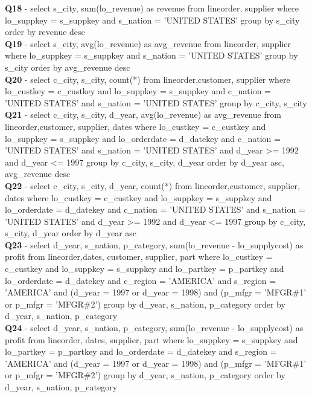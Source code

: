 \textbf{Q18} - select s\_city, sum(lo\_revenue) as revenue from lineorder, supplier where lo\_suppkey = s\_suppkey and s\_nation = 'UNITED STATES' group by s\_city order by revenue desc \\

\textbf{Q19} - select s\_city, avg(lo\_revenue) as avg\_revenue from lineorder, supplier where lo\_suppkey = s\_suppkey and s\_nation = 'UNITED STATES' group by s\_city order by avg\_revenue desc \\

\textbf{Q20} - select c\_city, s\_city, count(*) from lineorder,customer,  supplier where lo\_custkey = c\_custkey and lo\_suppkey = s\_suppkey and c\_nation = 'UNITED STATES' and s\_nation = 'UNITED STATES' group by c\_city, s\_city \\

\textbf{Q21} - select c\_city, s\_city, d\_year, avg(lo\_revenue) as avg\_revenue from  lineorder,customer, supplier, dates where lo\_custkey = c\_custkey and lo\_suppkey = s\_suppkey and lo\_orderdate = d\_datekey and c\_nation = 'UNITED STATES' and s\_nation = 'UNITED STATES' and d\_year >= 1992 and d\_year <= 1997 group by c\_city, s\_city, d\_year order by d\_year asc, avg\_revenue desc \\

\textbf{Q22} - select c\_city, s\_city, d\_year, count(*) from lineorder,customer,  supplier, dates where lo\_custkey = c\_custkey and lo\_suppkey = s\_suppkey and lo\_orderdate = d\_datekey and c\_nation = 'UNITED STATES' and s\_nation = 'UNITED STATES' and d\_year >= 1992 and d\_year <= 1997 group by c\_city, s\_city, d\_year order by d\_year asc \\

\textbf{Q23 }- select d\_year, s\_nation, p\_category, sum(lo\_revenue - lo\_supplycost) as profit from lineorder,dates, customer, supplier, part  where lo\_custkey = c\_custkey and lo\_suppkey = s\_suppkey and lo\_partkey = p\_partkey and lo\_orderdate = d\_datekey and c\_region = 'AMERICA' and s\_region = 'AMERICA' and (d\_year = 1997 or d\_year = 1998) and (p\_mfgr = 'MFGR\#1' or p\_mfgr = 'MFGR\#2') group by d\_year, s\_nation, p\_category order by d\_year, s\_nation, p\_category \\

\textbf{Q24} - select d\_year, s\_nation, p\_category, sum(lo\_revenue - lo\_supplycost) as profit from lineorder, dates, supplier, part  where lo\_suppkey = s\_suppkey and lo\_partkey = p\_partkey and lo\_orderdate = d\_datekey and s\_region = 'AMERICA' and (d\_year = 1997 or d\_year = 1998) and (p\_mfgr = 'MFGR\#1' or p\_mfgr = 'MFGR\#2') group by d\_year, s\_nation, p\_category order by d\_year, s\_nation, p\_category \\


